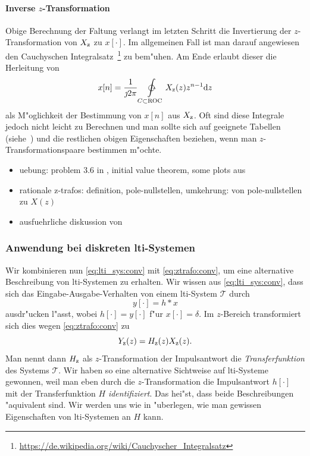 \paragraph{Inverse \texorpdfstring{$z$}{z}-Transformation}
Obige Berechnung der Faltung verlangt im letzten Schritt die Invertierung der $z$-Transformation von $X_{{\rm z}}$ zu $x[\cdot]$.
Im allgemeinen Fall ist man darauf angewiesen den Cauchyschen Integralsatz~\footnote{\url{https://de.wikipedia.org/wiki/Cauchyscher_Integralsatz}} zu bem"uhen.
Am Ende erlaubt dieser die Herleitung von
\begin{equation}\label{eq:ztrafo:inv}
    x[n] = \frac{1}{\jmath 2 \pi} \ointctrclockwise\limits_{C \subset \mathrm{ROC}} X_{\z}(z) z^{n-1} \mathrm{d}z
\end{equation}
als M"oglichkeit der Bestimmung von $x[n]$ aus $X_{{\rm z}}$.
Oft sind diese Integrale jedoch nicht leicht zu Berechnen und man sollte sich auf geeignete Tabellen (siehe~\cite[Tabelle~3.2,~Tabelle~3.3]{proakis2013}) und die restlichen obigen Eigenschaften beziehen, wenn man $z$-Transformationspaare bestimmen m"ochte.
\begin{itemize}
    \item uebung: problem 3.6 in \cite{proakis2013}, initial value theorem, some plots aus \cite{proakis2013}
    \item rationale z-trafos: definition, pole-nullstellen, umkehrung: von pole-nullstellen zu $X(z)$
    \item ausfuehrliche diskussion von \cite[fig 3.3.5, 3.3.6]{proakis2013} 
\end{itemize}
%
%
\subsubsection{Anwendung bei diskreten \texorpdfstring{\gls{lti}}{LTI}-Systemen}
%
Wir kombinieren nun \eqref{eq:lti_sys:conv} mit \eqref{eq:ztrafo:conv}, um eine alternative Beschreibung von \gls{lti}-Systemen zu erhalten.
Wir wissen aus \eqref{eq:lti_sys:conv}, dass sich das Eingabe-Ausgabe-Verhalten von einem \gls{lti}-System $\mathcal{T}$ durch
\[
y[\cdot] = h \ast x
\]
ausdr"ucken l"asst, wobei $h[\cdot] = y[\cdot]$ f"ur $x[\cdot]=\delta$.
Im $z$-Bereich transformiert sich dies wegen \eqref{eq:ztrafo:conv} zu
\begin{equation}\label{eq:ztrafo:transfer_function}
    Y_{\rm z}(z) = H_{\rm z}(z) X_{\rm z}(z).
\end{equation}
Man nennt dann $H_{{\rm z}}$ als $z$-Transformation der Impulsantwort die \emph{Transferfunktion} des Systems $\mathcal{T}$.
Wir haben so eine alternative Sichtweise auf \gls{lti}-Systeme gewonnen, weil man eben durch die $z$-Transformation die Impulsantwort $h[\cdot]$ mit der Transferfunktion $H$ \emph{identifiziert}.
Das hei"st, dass beide Beschreibungen "aquivalent sind.
Wir werden uns wie in  "uberlegen, wie man gewissen Eigenschaften von \gls{lti}-Systemen an $H$  kann.

